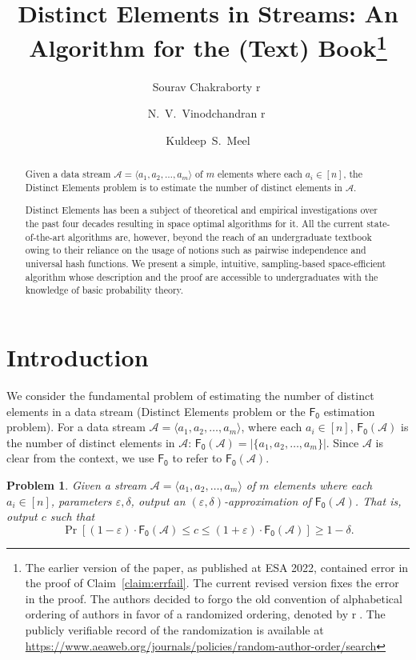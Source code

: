 \documentclass[a4paper,UKenglish,cleveref, autoref, thm-restate]{lipics-v2021}
\title{Distinct Elements in Streams: An Algorithm for the (Text) Book\thanks{The earlier version of the paper, as published at ESA 2022, contained error in the proof of  Claim~\ref{claim:errfail}. The current revised version fixes the error in the proof. The authors decided to forgo the old convention of alphabetical ordering of authors in favor of a randomized ordering, denoted by \textcircled{r}. The publicly verifiable record of the randomization is available at \protect\url{https://www.aeaweb.org/journals/policies/random-author-order/search}}}
\author{Sourav Chakraborty \textcircled{r}}{Indian Statistical Institute, India 

}{}{}{}
\author{N.~V.~Vinodchandran \textcircled{r}}{University of Nebraska-Lincoln, USA 

}{}{}{}
\author{Kuldeep~S.~Meel}{National University of Singapore, Singapore 


}
{}{}{}
\newcommand{\stream}{\mathcal{A}}
\newcommand{\Fo}{\ensuremath{\mathsf{F_0}}}
\newtheorem{problem}[theorem]{Problem}
\begin{document}
\maketitle

\begin{abstract}
 Given a data stream $\stream = \langle a_1, a_2, \ldots, a_m \rangle$ of $m$ elements where each $a_i \in [n]$, the Distinct Elements problem is to estimate the number of distinct elements in $\stream$. 
 
 Distinct Elements has been a subject of  theoretical and empirical investigations over the past four decades resulting in space optimal algorithms for it. 
 All the current state-of-the-art algorithms are, however, beyond the reach of an undergraduate textbook owing to their reliance on the usage of notions such as pairwise independence and universal hash functions. We present a simple, intuitive, sampling-based space-efficient algorithm whose description and the proof are accessible to undergraduates with the knowledge of basic probability theory. 
\end{abstract}







\section{Introduction}
We consider the fundamental problem of estimating the number of distinct elements  in a data stream (Distinct Elements problem or the $\Fo$ estimation problem). For a data stream $\stream = \langle a_1,a_2,\ldots, a_m\rangle$, where each $a_i\in [n]$, $\Fo(\stream)$ is the number of distinct elements in $\stream$: $\Fo(\stream) = |\{a_1,a_2,\ldots,a_m\}|$. Since $\stream$ is clear from the context, we use $\Fo$ to refer to $\Fo(\stream)$. 


\begin{problem}\label{prob:delphic}
 Given a stream $\stream= \langle a_1, a_2, \ldots, a_m\rangle$ of $m$ elements where each $a_i \in [n]$, parameters $\varepsilon,\delta$, output an $(\varepsilon,\delta)$-approximation of $\Fo(\stream)$. That is, output 
 $c$ such that 
  $$\Pr[ (1-\varepsilon) \cdot \Fo(\stream) \leq c \leq (1+\varepsilon) \cdot \Fo (\stream)] \geq 1-\delta.$$
\end{problem}
\end{document}
